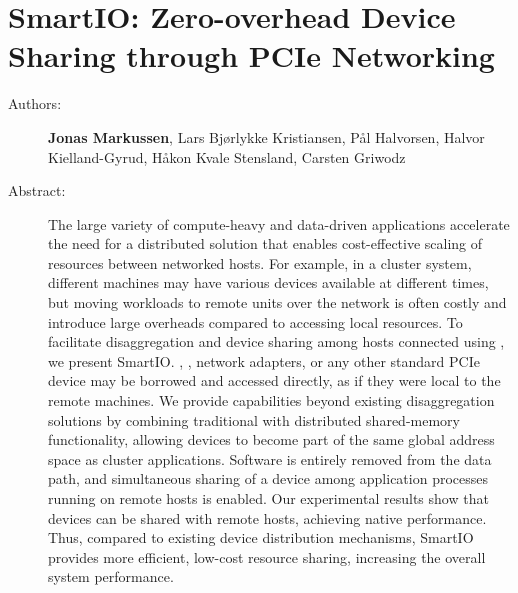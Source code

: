 \chapter{SmartIO: Zero-overhead Device Sharing through PCIe Networking}
\label{paper:TOCS}
\paperthumb

\begin{description}
	\item[Authors:]
		\textbf{Jonas Markussen}, Lars Bj{\o}rlykke Kristiansen, P{\aa}l Halvorsen,
		Halvor Kielland-Gyrud, H{\aa}kon Kvale Stensland, Carsten Griwodz

	\item[Abstract:]
		The large variety of compute-heavy and data-driven applications accelerate the need for a distributed
		 solution that enables cost-effective scaling of resources between networked hosts. For example,
		in a cluster system, different machines may have various devices available at different times, 
		but moving workloads to remote units over the network is often costly and introduce 
		large overheads compared to accessing local resources. 
		To facilitate  \gls{disaggregation} and device sharing among hosts connected using  
		, we present SmartIO. , , network adapters, 
		or any other standard PCIe device may be borrowed and accessed directly, as if they were local to the remote machines.
		We provide capabilities beyond existing \gls{disaggregation} solutions 
		by combining traditional  with distributed shared-memory functionality, allowing devices 
		to become part of the same global address space as cluster applications.
		Software is entirely removed from the data path, and simultaneous sharing of a device among 
		application processes running on remote hosts is enabled.
		Our experimental results show that  devices can be shared with remote hosts,
		achieving native  performance.
		Thus, compared to existing device distribution mechanisms, SmartIO provides more efficient, low-cost resource
		sharing, increasing the overall system performance.


\end{description}
